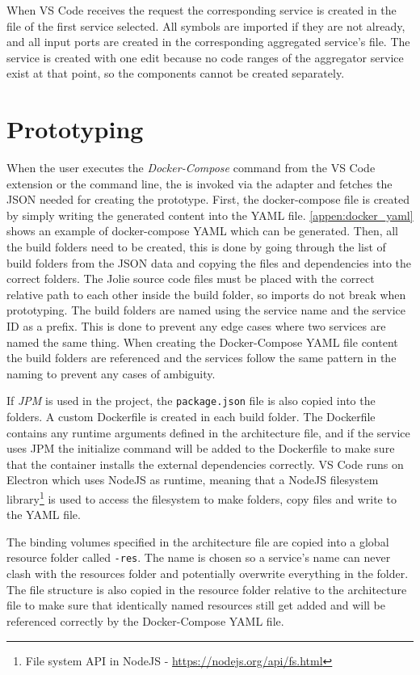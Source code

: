 When VS Code receives the request the corresponding service is created in the file of the first service selected.
All symbols are imported if they are not already, and all input ports are created in the corresponding aggregated service's file.
The service is created with one edit because no code ranges of the aggregator service exist at that point, so the components cannot be created separately.

\section{Prototyping}
When the user executes the \emph{Docker-Compose} command from the VS Code extension or the command line, the
\javatoolname[] is invoked via the adapter and fetches the JSON needed for creating the prototype.
First, the docker-compose file is created by simply writing the generated content into the YAML file.
\cref{appen:docker_yaml} shows an example of docker-compose YAML which can be generated.
Then, all the build folders need to be created, this is done by going through the list of build folders from the JSON data and copying the files and dependencies into the correct folders.
The Jolie source code files must be placed with the correct relative path to each other inside the build folder, so imports do not break when prototyping.
The build folders are named using the service name and the service ID as a prefix. This is done to prevent any edge cases where two services are named the same thing.
When creating the Docker-Compose YAML file content the build folders are referenced and the services follow the same pattern in the naming to prevent any cases of ambiguity.

If \emph{JPM} is used in the project, the \texttt{package.json} file is also copied into the folders.
A custom Dockerfile is created in each build folder. The Dockerfile contains any runtime arguments defined in the architecture file, and if the service uses JPM the initialize command will be added to the Dockerfile to make sure that the container installs the external dependencies correctly.
VS Code runs on Electron which uses NodeJS as runtime, meaning that a NodeJS filesystem library\footnote{File system API in NodeJS - \url{https://nodejs.org/api/fs.html}} is used to access the filesystem to make folders, copy files and write to the YAML file.

The binding volumes specified in the architecture file are copied into a global resource folder called \texttt{-res}. The name is chosen so a service's name can never clash with the resources folder and potentially overwrite everything in the folder.
The file structure is also copied in the resource folder relative to the architecture file to make sure that identically named resources still get added and will be referenced correctly by the Docker-Compose YAML file.

